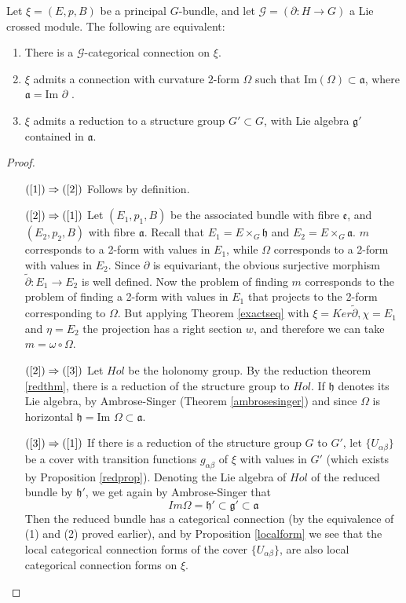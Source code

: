 \begin{theorem}\label{mainthm}
Let $\xi=(E,p,B)$ be a principal $G$-bundle, and let $\mathcal{G}=(\partial:H\rightarrow G)$ a Lie crossed module. The following are equivalent:
\begin{enumerate}
\item There is a $\mathcal{G}$-categorical connection on $\xi$. \label{1}
\item $\xi$ admits a connection with curvature $2$-form $\Omega$ such that $\text{Im}(\Omega)\subset \mathfrak{a}$, where $\mathfrak{a}=\text{Im }\partial$ .\label{2}
\item $\xi$ admits a reduction to a structure group $G'\subset G$, with Lie algebra $\mathfrak{g}'$ contained in $\mathfrak{a}$. \label{3}
\end{enumerate}
\end{theorem}
\begin{proof}\hspace*{\fill}\\ \begin{itemize}
\item[\footnotesize{$(\ref{1})\Rightarrow (\ref{2})$}] Follows by definition. 
\item[\footnotesize{$(\ref{2})\Rightarrow (\ref{1})$}] Let $(E_1,p_1,B)$ be the associated bundle with fibre $\mathfrak{e}$, and $(E_2,p_2,B)$ with fibre $\mathfrak{a}$. Recall that $E_1=E\times_G \mathfrak{h}$ and $E_2=E\times_G \mathfrak{a}$. $m$ corresponds to a 2-form with values in $E_1$, while $\Omega$ corresponds to a 2-form with values in $E_2$. Since $\partial$ is equivariant, the obvious surjective morphism $\widetilde{\partial}:E_1\rightarrow E_2$ is well defined. 
Now the problem of finding $m$ corresponds to the problem of finding a 2-form with values in $E_1$ that projects to the 2-form corresponding to $\Omega$. But applying Theorem \ref{exactseq} with $\xi=Ker \widetilde{\partial}, \chi=E_1$ and $\eta=E_2$ the projection has a right section $w$, and therefore we can take $m=\omega\circ\Omega$.
\item[\footnotesize{$(\ref{2})\Rightarrow (\ref{3})$}] Let $Hol$ be the holonomy group. By the reduction theorem \ref{redthm}, there is a reduction of the structure group to $Hol$. If $\mathfrak{h}$ denotes its Lie algebra, by Ambrose-Singer (Theorem \ref{ambrosesinger}) and since $\Omega$ is horizontal $\mathfrak{h}=\text{Im } \Omega \subset \mathfrak{a}$.
\item[\footnotesize{$(\ref{3})\Rightarrow (\ref{1})$}] If there is a reduction of the structure group $G$ to $G'$, let $\{U_{\alpha\beta}\}$ be a cover with transition functions $g_{\alpha\beta}$ of $\xi$ with values in $G'$ (which exists by Proposition \ref{redprop}). Denoting the Lie algebra of $Hol$ of the reduced bundle by $\mathfrak{h'}$, we get again by Ambrose-Singer that \[
Im \Omega=\mathfrak{h}'\subset \mathfrak{g}' \subset \mathfrak{a}
\] Then the reduced bundle has a categorical connection (by the equivalence of (1) and (2) proved earlier), and by Proposition \ref{localform} we see that the local categorical connection forms of the cover $\{U_{\alpha\beta}\}$, are also local categorical connection forms on $\xi$.
             \end{itemize}
\end{proof}
